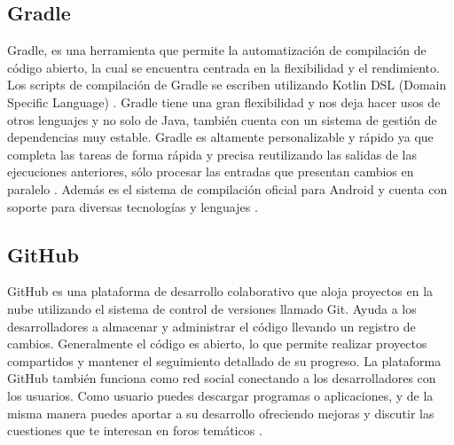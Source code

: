 \subsection{Gradle}

\begin{list}{}%
    {\setlength{\leftmargin}{1cm}\setlength{\rightmargin}{1cm}}
    \item\relax
    \small

Gradle, es una herramienta que permite la automatización de compilación de código abierto, la cual se encuentra centrada en la flexibilidad y el rendimiento. Los scripts de compilación de Gradle se escriben utilizando Kotlin DSL (Domain Specific Language) \cite{CitaD20}.
Gradle tiene una gran flexibilidad y nos deja hacer usos de otros lenguajes y no solo de Java, también cuenta con un sistema de gestión de dependencias muy estable. Gradle es altamente personalizable y rápido ya que completa las tareas de forma rápida y precisa reutilizando las salidas de las ejecuciones anteriores, sólo procesar las entradas que presentan cambios en paralelo \cite{CitaD20}.
Además es el sistema de compilación oficial para Android y cuenta con soporte para diversas tecnologías y lenguajes \cite{CitaD20}.

\end{list}


\subsection{GitHub}

\begin{list}{}%
    {\setlength{\leftmargin}{1cm}\setlength{\rightmargin}{1cm}}
    \item\relax
    \small

GitHub es una plataforma de desarrollo colaborativo que aloja proyectos en la nube utilizando el sistema de control de versiones llamado Git. Ayuda a los desarrolladores a almacenar y administrar el código llevando un registro de cambios. Generalmente el código es abierto, lo que permite realizar proyectos compartidos y mantener el seguimiento detallado de su progreso. La plataforma GitHub también funciona como red social conectando a los desarrolladores con los usuarios. Como usuario puedes descargar programas o aplicaciones, y de la misma manera puedes aportar a su desarrollo ofreciendo mejoras y discutir las cuestiones que te interesan en foros temáticos \cite{CitaD21}.
\end{list}

